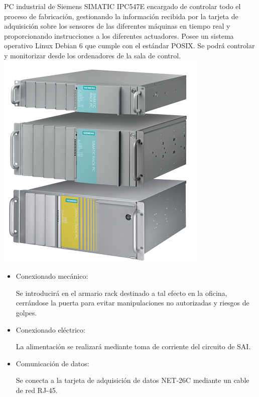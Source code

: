 	PC industrial de Siemens SIMATIC IPC547E encargado de controlar todo el proceso de fabricación, gestionando la información recibida por la tarjeta de adquisición sobre los sensores de las diferentes máquinas en tiempo real y proporcionando instrucciones a los diferentes actuadores. Posee un sistema operativo Linux Debian 6 que cumple con el estándar POSIX. Se podrá controlar y monitorizar desde los ordenadores de la sala de control.\\

	\includegraphics[scale=0.4]{Datasheets/12Foto.png}\\

		\begin{itemize}
				\item{Conexionado mecánico:}
				
				Se introducirá en el armario rack destinado a tal efecto en la oficina, cerrándose la puerta para evitar manipulaciones no autorizadas y riesgos de golpes.

				\item{Conexionado eléctrico:}
				
				La alimentación se realizará mediante toma de corriente del circuito de SAI.

				\item{Comunicación de datos:}
				
				Se conecta a la tarjeta de adquisición de datos NET-26C mediante un cable de red RJ-45.
		\end{itemize}

\newpage
	
